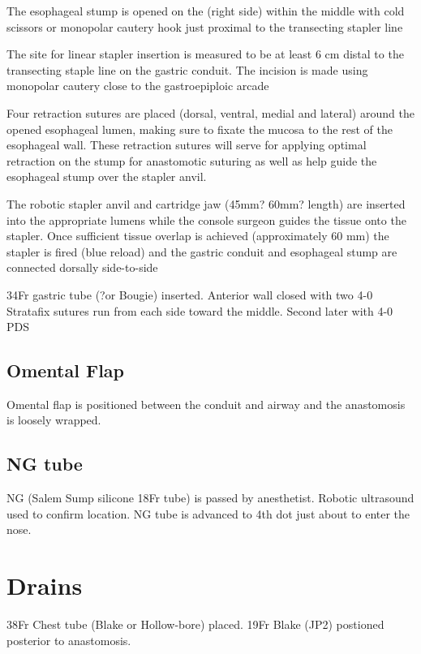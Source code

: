 \documentclass[
  letterpaper,
]{scrbook}
\begin{document}
The esophageal stump is opened on the (right side) within the middle
with cold scissors or monopolar cautery hook just proximal to the
transecting stapler line

The site for linear stapler insertion is measured to be at least 6 cm
distal to the transecting staple line on the gastric conduit. The
incision is made using monopolar cautery close to the gastroepiploic
arcade

Four retraction sutures are placed (dorsal, ventral, medial and lateral)
around the opened esophageal lumen, making sure to fixate the mucosa to
the rest of the esophageal wall. These retraction sutures will serve for
applying optimal retraction on the stump for anastomotic suturing as
well as help guide the esophageal stump over the stapler anvil.

The robotic stapler anvil and cartridge jaw (45mm? 60mm? length) are
inserted into the appropriate lumens while the console surgeon guides
the tissue onto the stapler. Once sufficient tissue overlap is achieved
(approximately 60 mm) the stapler is fired (blue reload) and the gastric
conduit and esophageal stump are connected dorsally side-to-side

34Fr gastric tube (?or Bougie) inserted. Anterior wall closed with two
4-0 Stratafix sutures run from each side toward the middle. Second later
with 4-0 PDS

\subsection{Omental Flap}\label{omental-flap}

Omental flap is positioned between the conduit and airway and the
anastomosis is loosely wrapped.

\subsection{NG tube}\label{ng-tube}

NG (Salem Sump silicone 18Fr tube) is passed by anesthetist. Robotic
ultrasound used to confirm location. NG tube is advanced to 4th dot just
about to enter the nose.

\section{Drains}\label{drains}

38Fr Chest tube (Blake or Hollow-bore) placed. 19Fr Blake (JP2)
postioned posterior to anastomosis.
\end{document}
